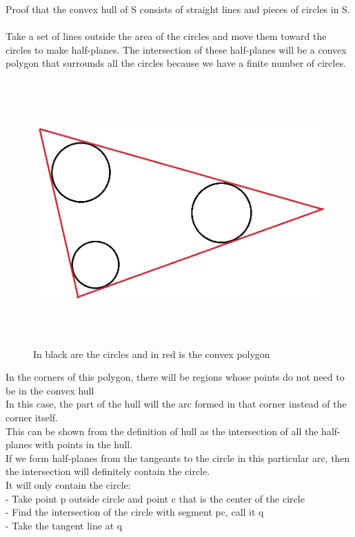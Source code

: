 \documentclass[11pt,psfig]{article}
\begin{document}
Proof that the convex hull of S consists of straight lines and pieces of circles in S. 
\\
\\
Take a set of lines outside the area of the circles and move them toward the circles to make half-planes. The intersection of these half-planes will be a convex polygon that surrounds all the circles because we have a finite number of circles. \\
\begin{figure}[H]
\centering
\includegraphics[height=4in]{hw1prob1-10a_1.jpg}
\caption{In black are the circles and in red is the convex polygon}
\end{figure}
In the corners of this polygon, there will be regions whose points do not need to be in the convex hull\\
In this case, the part of the hull will the arc formed in that corner instead of the corner itself. 
\\    This can be shown from the definition of hull as the intersection of all the half-planes with points in the hull. 
\\     If we form half-planes from the tangeants to the circle in this particular arc, then the intersection will definitely contain the circle. 
\\     It will only contain the circle:
\\					- Take point p outside circle and point c that is the center of the circle
\\					- Find the intersection of the circle with segment pc, call it q
\\					- Take the tangent line at q
\end{document}
